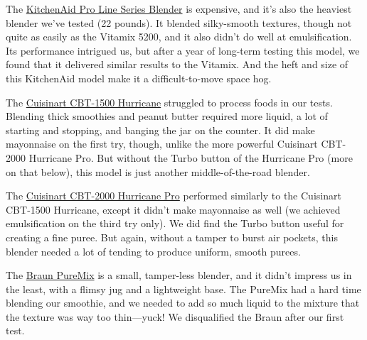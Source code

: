 The
\href{https://www.nytimes3xbfgragh.onion/wirecutter/out/link/15879/130108/4/57879/?merchant=Amazon}{KitchenAid
Pro Line Series Blender} is expensive, and it's also the heaviest
blender we've tested (22 pounds). It blended silky-smooth textures,
though not quite as easily as the Vitamix 5200, and it also didn't do
well at emulsification. Its performance intrigued us, but after a year
of long-term testing this model, we found that it delivered similar
results to the Vitamix. And the heft and size of this KitchenAid model
make it a difficult-to-move space hog.

The
\href{https://www.nytimes3xbfgragh.onion/wirecutter/out/link/13556/38700/4/57877/?merchant=Amazon}{Cuisinart
CBT-1500 Hurricane} struggled to process foods in our tests. Blending
thick smoothies and peanut butter required more liquid, a lot of
starting and stopping, and banging the jar on the counter. It did make
mayonnaise on the first try, though, unlike the more powerful Cuisinart
CBT-2000 Hurricane Pro. But without the Turbo button of the Hurricane
Pro (more on that below), this model is just another middle-of-the-road
blender.

The
\href{https://www.nytimes3xbfgragh.onion/wirecutter/out/link/13557/38703/4/57878/?merchant=Amazon}{Cuisinart
CBT-2000 Hurricane Pro} performed similarly to the Cuisinart CBT-1500
Hurricane, except it didn't make mayonnaise as well (we achieved
emulsification on the third try only). We did find the Turbo button
useful for creating a fine puree. But again, without a tamper to burst
air pockets, this blender needed a lot of tending to produce uniform,
smooth purees.

The
\href{https://www.nytimes3xbfgragh.onion/wirecutter/out/link/15878/47240/4/57876/?merchant=Amazon}{Braun
PureMix} is a small, tamper-less blender, and it didn't impress us in
the least, with a flimsy jug and a lightweight base. The PureMix had a
hard time blending our smoothie, and we needed to add so much liquid to
the mixture that the texture was way too thin---yuck! We disqualified
the Braun after our first test.

